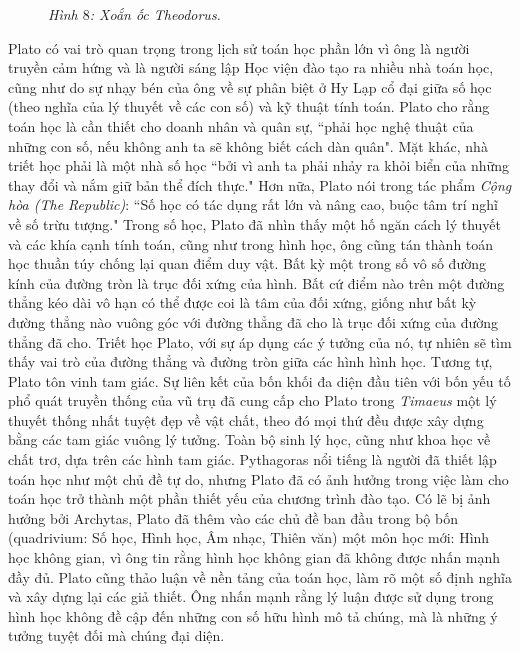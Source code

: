 \begin{multicols}{2}
\begin{figure}[H]
		\caption{\small\textit{\color{lichsutoanhoc}Hình $8$: Xoắn ốc Theodorus.}}
		\vspace*{-10pt}
	\end{figure}
	Plato có vai trò quan trọng trong lịch sử toán học phần lớn vì ông là người truyền cảm hứng và là người sáng lập Học viện đào tạo ra nhiều nhà toán học, cũng như do sự nhạy bén của ông về sự phân biệt ở Hy Lạp cổ đại giữa số học (theo nghĩa của lý thuyết về các con số) và kỹ thuật tính toán. 
	\vskip 0.1cm
	Plato cho rằng toán học là cần thiết cho doanh nhân và quân sự, ``phải học nghệ thuật của những con số, nếu không anh ta sẽ không biết cách dàn quân".
	\vskip 0.1cm
	Mặt khác, nhà triết học phải là một nhà số học ``bởi vì anh ta phải nhảy ra khỏi biển của những thay đổi và nắm giữ bản thể đích thực." Hơn nữa, Plato nói trong tác phẩm \textit{Cộng hòa (The Republic)}: ``Số học có tác dụng rất lớn và nâng cao, buộc tâm trí nghĩ về số trừu tượng."
	\vskip 0.1cm 
	Trong số học, Plato đã nhìn thấy một hố ngăn cách lý thuyết và các khía cạnh tính toán, cũng như trong hình học, ông cũng tán thành toán học thuần túy chống lại quan điểm duy vật.  
	\vskip 0.1cm
	Bất kỳ một trong số vô số đường kính của đường tròn là trục đối xứng của hình. Bất cứ điểm nào trên một đường thẳng kéo dài vô hạn có thể được coi là tâm của đối xứng, giống như bất kỳ đường thẳng nào vuông góc với đường thẳng đã cho là trục đối xứng của đường thẳng đã cho. Triết học Plato, với sự áp dụng các ý tưởng của nó, tự nhiên sẽ tìm thấy vai trò của đường thẳng và đường tròn giữa các hình hình học. Tương tự, Plato tôn vinh tam giác.
	\vskip 0.1cm 
	Sự liên kết của bốn khối đa diện đầu tiên với bốn yếu tố phổ quát truyền thống của vũ trụ đã cung cấp cho Plato trong \textit{Timaeus}  một lý thuyết thống nhất tuyệt đẹp về vật chất, theo đó mọi thứ đều được xây dựng bằng các tam giác vuông lý tưởng. Toàn bộ sinh lý học, cũng như khoa học về chất trơ, dựa trên các hình tam giác.
	\vskip 0.1cm
	Pythagoras nổi tiếng là người đã thiết lập toán học như một chủ đề tự do, nhưng Plato đã có ảnh hưởng trong việc làm cho toán học trở thành một phần thiết yếu của chương trình đào tạo.
	\vskip 0.1cm
	Có lẽ bị ảnh hưởng bởi Archytas, Plato đã thêm vào các chủ đề ban đầu trong bộ bốn (quadrivium: Số học, Hình học, Âm nhạc, Thiên văn) một môn học mới: Hình học không gian, vì ông tin rằng hình học không gian đã không được nhấn mạnh đầy đủ. Plato cũng thảo luận về nền tảng của toán học, làm rõ một số định nghĩa và xây dựng lại các giả thiết. Ông nhấn mạnh rằng lý luận được sử dụng trong hình học không đề cập đến những con số hữu hình mô tả chúng, mà là những ý tưởng tuyệt đối mà chúng đại diện. 

\end{multicols}
